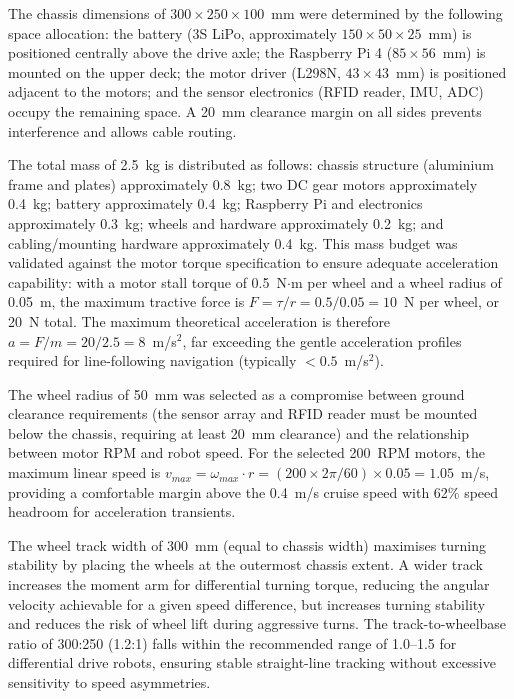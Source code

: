 \documentclass[12pt,a4paper,oneside]{report}
\begin{document}
The chassis dimensions of $300 \times 250 \times 100$~mm were determined by the following space allocation: the battery (3S LiPo, approximately $150 \times 50 \times 25$~mm) is positioned centrally above the drive axle; the Raspberry Pi 4 ($85 \times 56$~mm) is mounted on the upper deck; the motor driver (L298N, $43 \times 43$~mm) is positioned adjacent to the motors; and the sensor electronics (RFID reader, IMU, ADC) occupy the remaining space. A 20~mm clearance margin on all sides prevents interference and allows cable routing.

The total mass of 2.5~kg is distributed as follows: chassis structure (aluminium frame and plates) approximately 0.8~kg; two DC gear motors approximately 0.4~kg; battery approximately 0.4~kg; Raspberry Pi and electronics approximately 0.3~kg; wheels and hardware approximately 0.2~kg; and cabling/mounting hardware approximately 0.4~kg. This mass budget was validated against the motor torque specification to ensure adequate acceleration capability: with a motor stall torque of 0.5~N$\cdot$m per wheel and a wheel radius of 0.05~m, the maximum tractive force is $F = \tau/r = 0.5/0.05 = 10$~N per wheel, or 20~N total. The maximum theoretical acceleration is therefore $a = F/m = 20/2.5 = 8$~m/s$^2$, far exceeding the gentle acceleration profiles required for line-following navigation (typically $< 0.5$~m/s$^2$).

The wheel radius of 50~mm was selected as a compromise between ground clearance requirements (the sensor array and RFID reader must be mounted below the chassis, requiring at least 20~mm clearance) and the relationship between motor RPM and robot speed. For the selected 200~RPM motors, the maximum linear speed is $v_{max} = \omega_{max} \cdot r = (200 \times 2\pi/60) \times 0.05 = 1.05$~m/s, providing a comfortable margin above the 0.4~m/s cruise speed with 62\% speed headroom for acceleration transients.

The wheel track width of 300~mm (equal to chassis width) maximises turning stability by placing the wheels at the outermost chassis extent. A wider track increases the moment arm for differential turning torque, reducing the angular velocity achievable for a given speed difference, but increases turning stability and reduces the risk of wheel lift during aggressive turns. The track-to-wheelbase ratio of 300:250 (1.2:1) falls within the recommended range of 1.0--1.5 for differential drive robots, ensuring stable straight-line tracking without excessive sensitivity to speed asymmetries.
\end{document}
